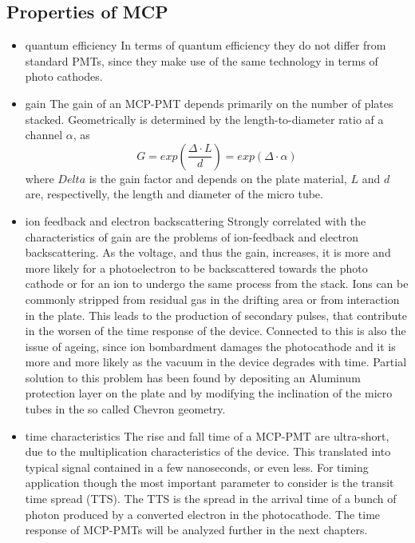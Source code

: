 \subsection{Properties of MCP}
\begin{itemize}
\item quantum efficiency
In terms of quantum efficiency they do not differ from standard PMTs, since they make use of the same technology in terms of photo cathodes.
\item gain
The gain of an MCP-PMT depends primarily on the number of plates stacked. Geometrically is determined by the length-to-diameter ratio af a channel $\alpha$, as
\begin{equation}
G = exp(\frac{\Delta \cdot L}{d}) = exp(\Delta \cdot \alpha)
\end{equation}
where $Delta$ is the gain factor and depends on the plate material, $L$ and $d$ are, respectivelly, the length and diameter of the micro tube.
\item ion feedback and electron backscattering
Strongly correlated with the characteristics of gain are the problems of ion-feedback and electron backscattering. As the voltage, and thus the gain, increases, it is more and more likely for a photoelectron to be backscattered towards the photo cathode or for an ion to undergo the same process from the stack. Ions can be commonly stripped from residual gas in the drifting area or from interaction in the plate.
This leads to the production of secondary pulses, that contribute in the worsen of the time response of the device.
Connected to this is also the issue of ageing, since ion bombardment damages the photocathode and it is more and more likely as the vacuum in the device degrades with time.
Partial solution to this problem has been found by depositing an Aluminum protection layer on the plate and by modifying the inclination of the micro tubes in the so called Chevron geometry\cite{Vavra2004}.

\item time characteristics
The rise and fall time of a MCP-PMT are ultra-short, due to the multiplication characteristics of the device. This translated into typical signal contained in a few nanoseconds, or even less. For timing application though the most important parameter to consider is the transit time spread (TTS). The TTS is the spread in the arrival time of a bunch of photon produced by a converted electron in the photocathode. The time response of MCP-PMTs will be analyzed further in the next chapters.

\end{itemize}

